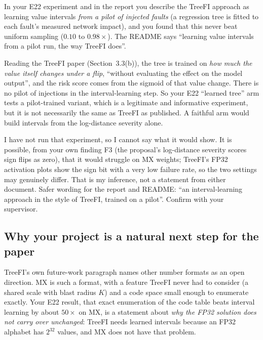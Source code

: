 \begin{careful}
In your E22 experiment and in the report you describe the TreeFI approach as learning value intervals \emph{from a pilot of injected faults} (a regression tree is fitted to each fault's measured network impact), and you found that
this never beat uniform sampling ($0.10$ to $0.98\times$). The README says ``learning value intervals from a pilot run, the way TreeFI does''.

Reading the TreeFI paper (Section~3.3(b)), the tree is trained on \emph{how much the value itself changes under a flip}, ``without evaluating the effect on the model output'', and the risk score comes from the sigmoid of that value change. There is no pilot of injections in the interval-learning step.
So your E22 ``learned tree'' arm tests a pilot-trained variant, which is a legitimate and informative experiment, but it is not necessarily the same as TreeFI as published. A faithful arm would build intervals from the log-distance severity alone.

I have not run that experiment, so I cannot say what it would show. It is possible, from your own finding F3 (the proposal's log-distance severity scores sign flips as zero), that it would struggle on MX weights; TreeFI's FP32 activation plots show the sign bit with a very low failure rate, so the two settings may genuinely differ. That is my inference, not a statement from either document.
Safer wording for the report and README: ``an interval-learning approach in the style of TreeFI, trained on a pilot''. Confirm with your supervisor.
\end{careful}

\subsection{Why your project is a natural next step for the paper}
TreeFI's own future-work paragraph names other number formats as an open direction. MX is such a format, with a feature TreeFI never had to consider (a shared scale with blast radius $K$) and a code space small enough to enumerate exactly. Your E22 result,
that exact enumeration of the code table beats interval learning by about $50\times$ on MX, is a statement about \emph{why the FP32 solution does not carry over unchanged}: TreeFI needs learned intervals because an FP32 alphabet has $2^{32}$ values, and MX does not have that problem.
